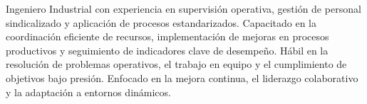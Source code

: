 \begin{cventries}

  \cventry
	{} %
    {} %
    {} %
    {} %
    {Ingeniero Industrial con experiencia en supervisión operativa, gestión de personal sindicalizado y aplicación de procesos estandarizados. Capacitado en la coordinación eficiente de recursos, implementación de mejoras en procesos productivos y seguimiento de indicadores clave de desempeño. Hábil en la resolución de problemas operativos, el trabajo en equipo y el cumplimiento de objetivos bajo presión. Enfocado en la mejora continua, el liderazgo colaborativo y la adaptación a entornos dinámicos.}
\end{cventries}
